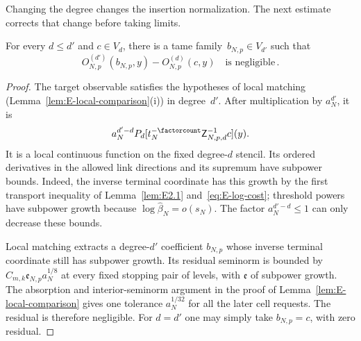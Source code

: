 Changing the degree changes the insertion normalization. The next estimate corrects that change before taking limits.
\begin{lemma}\label{lem:E2.8}
For every $d\le d'$ and $c\in V_d$, there is a tame family~$b_{N,p}\in V_{d'}$ such that
\begin{equation*}
O^{(d')}_{N,p}(b_{N,p},y)-O^{(d)}_{N,p}(c,y)
\quad\text{is negligible}\,.
\end{equation*}
\end{lemma}
\begin{proof}
The target observable satisfies the hypotheses of local matching (Lemma~\ref{lem:E-local-comparison}(i)) in degree~$d'$. After multiplication by $a_N^{d'}$, it is
\begin{equation*}
a_N^{d'-d}P_d[t_N^{-\factorcount}\mathsf Z_{N,p,d}^{-1}c](y).
\end{equation*}
It is a local continuous function on the fixed degree-$d$ stencil. Its ordered derivatives in the allowed link directions and its supremum have subpower bounds. Indeed, the inverse terminal coordinate has this growth by the first transport inequality of Lemma~\ref{lem:E2.1} and~\eqref{eq:E-log-cost}; threshold powers have subpower growth because $\log\widehat\beta_N=o(s_N)$. The factor $a_N^{d'-d}\le1$ can only decrease these bounds.

Local matching extracts a degree-$d'$ coefficient $b_{N,p}$ whose inverse terminal coordinate still has subpower growth. Its residual seminorm is bounded by $C_{m,k}\mathfrak e_{N,p}a_N^{1/8}$ at every fixed stopping pair of levels, with $\mathfrak e$ of subpower growth. The absorption and interior-seminorm argument in the proof of Lemma~\ref{lem:E-local-comparison} gives one tolerance $a_N^{1/32}$ for all the later cell requests. The residual is therefore negligible. For $d=d'$ one may simply take $b_{N,p}=c$, with zero residual.
\end{proof}

